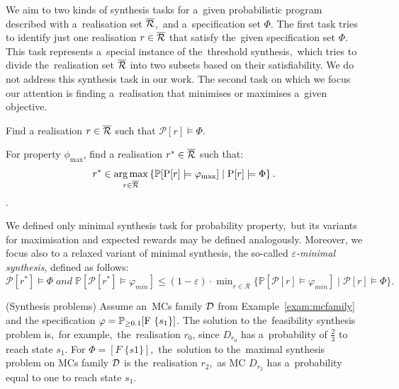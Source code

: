 We aim to two kinds of synthesis tasks for a~given probabilistic program described with a~realisation set $\overline{\mathcal{R}}$,~and a~specification set $\Phi$.
The first task tries to identify just one realisation $r \in \overline{\mathcal{R}}$ that satisfy the~given specification set $\Phi$.
This task represents a~special instance of the~threshold synthesis,~which tries to divide the~realisation set $\overline{\mathcal{R}}$ into two subsets based on their satisfiability.
We do not address this synthesis task in our work.
The second task on which we focus our attention is finding a~realisation that minimises or maximises a~given objective.

\begin{definition}[Feasibility]
Find a realisation $r \in \overline{\mathcal{R}}$ such that $\mathcal{P}[r] \models \Phi$. 
\end{definition}

\begin{definition}[Minimality]
For property $\phi_{\max}$, find a realisation $r^* \in \overline{\mathcal{R}}$ such that:
$$r^* \in \operatorname*{arg\,max}_{r \in \overline{\mathcal{R}}} \left \{ \mathbb{P}[\mathrm{P}[r] \models \varphi_{\max}] \mid \mathrm{P}[r] \models \Phi \right \}.$$.
\end{definition}

We defined only minimal synthesis task for probability property,~but its variants for maximisation and expected rewards may be defined analogously.
Moreover, we focus also to a relaxed variant of minimal synthesis, the so-called \textit{$\varepsilon$-minimal synthesis}, defined as follows: $\mathcal{P}[r^*] \models \varPhi \; and \; 
\mathbb{P}[\mathcal{P}[r^*] \models \varphi_{min}] \leq (1 - \varepsilon) \cdot \min_{r \in \mathcal{\overline{R}}} \{ \mathbb{P}[\mathcal{P}[r] \models \varphi_{min}] \; \lvert \; \mathcal{P}[r] \models \varPhi \}.$

\begin{example} (Synthesis problems)
Assume an~MCs family $\mathcal{D}$ from Example~\ref{exam:mcfamily} and the specification $\varphi = \mathbb{P}_{\geq 0.1}[\mathrm{F}\ \{s_1\}]$.
The solution to the~feasibility synthesis problem is,~for example,~the~realisation $r_0$, since $D_{r_0}$ has a~probability of $\frac{2}{3}$ to reach state $s_1$.
For $\Phi = [F \; \{s1\}]$,~the~solution to the~maximal synthesis problem on MCs family $\mathcal{D}$ is the~realisation $r_2$,~as MC $D_{r_2}$ has a~probability equal to one to reach state $s_1$.
\end{example}

